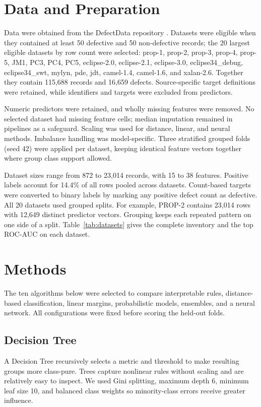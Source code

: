 \documentclass[conference]{IEEEtran}
\begin{document}
\section{Data and Preparation}
Data were obtained from the DefectData repository \cite{defectdata}. Datasets were eligible when they contained at least 50 defective and 50 non-defective records; the 20 largest eligible datasets by row count were selected: prop-1, prop-2, prop-3, prop-4, prop-5, JM1, PC3, PC4, PC5, eclipse-2.0, eclipse-2.1, eclipse-3.0, eclipse34\_debug, eclipse34\_swt, mylyn, pde, jdt, camel-1.4, camel-1.6, and xalan-2.6. Together they contain 115,688 records and 16,659 defects. Source-specific target definitions were retained, while identifiers and targets were excluded from predictors.

Numeric predictors were retained, and wholly missing features were removed. No selected dataset had missing feature cells; median imputation remained in pipelines as a safeguard. Scaling was used for distance, linear, and neural methods. Imbalance handling was model-specific. Three stratified grouped folds (seed 42) were applied per dataset, keeping identical feature vectors together where group class support allowed.

Dataset sizes range from 872 to 23,014 records, with 15 to 38 features. Positive labels account for 14.4\% of all rows pooled across datasets. Count-based targets were converted to binary labels by marking any positive defect count as defective. All 20 datasets used grouped splits. For example, PROP-2 contains 23,014 rows with 12,649 distinct predictor vectors. Grouping keeps each repeated pattern on one side of a split. Table~\ref{tab:datasets} gives the complete inventory and the top ROC-AUC on each dataset.
\section{Methods}
The ten algorithms below were selected to compare interpretable rules, distance-based classification, linear margins, probabilistic models, ensembles, and a neural network. All configurations were fixed before scoring the held-out folds.
\subsection{Decision Tree}
A Decision Tree recursively selects a metric and threshold to make resulting groups more class-pure. Trees capture nonlinear rules without scaling and are relatively easy to inspect. We used Gini splitting, maximum depth 6, minimum leaf size 10, and balanced class weights so minority-class errors receive greater influence.
\end{document}
